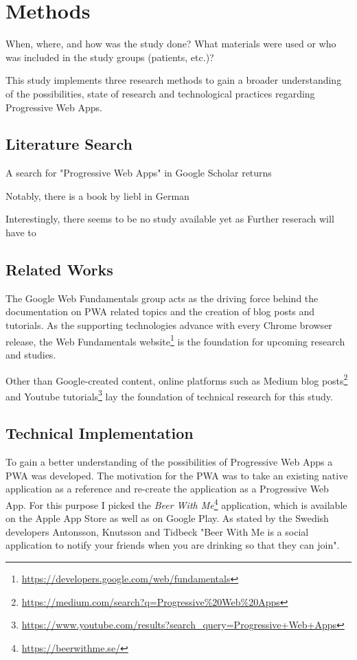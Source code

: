 \chapter{Methods}
When, where, and how was the study done? What materials were used or who was included in the study groups (patients, etc.)?

This study implements three research methods to gain a broader understanding of the possibilities, state of research and technological practices regarding Progressive Web Apps.

\section{Literature Search}

A search for "Progressive Web Apps" in Google Scholar returns

Notably, there is a book by liebl in German

Interestingly, there seems to be no study available yet as
Further reserach will have to

\section{Related Works}
The Google Web Fundamentals group acts as the driving force behind the documentation on PWA related topics and the creation of blog posts and tutorials. As the supporting technologies advance with every Chrome browser release, the Web Fundamentals website\footnote{\url{https://developers.google.com/web/fundamentals}} is the foundation for upcoming research and studies.

Other than Google-created content, online platforms such as Medium blog posts\footnote{\url{https://medium.com/search?q=Progressive\%20Web\%20Apps}} and Youtube tutorials\footnote{\url{https://www.youtube.com/results?search_query=Progressive+Web+Apps}} lay the foundation of technical research for this study.

\section{Technical Implementation}
To gain a better understanding of the possibilities of Progressive Web Apps a PWA was developed. The motivation for the PWA was to take an existing native application as a reference and re-create the application as a Progressive Web App. For this purpose I picked the \textit{Beer With Me}\footnote{\url{https://beerwithme.se/}} application, which is available on the Apple App Store as well as on Google Play. As stated by the Swedish developers Antonsson, Knutsson and Tidbeck "Beer With Me is a social application to notify your friends when you are drinking so that they can join".
